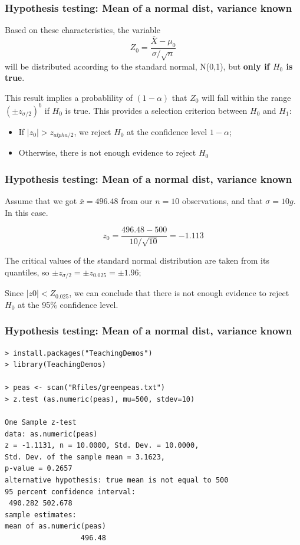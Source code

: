 \documentclass[10pt]{beamer}
\begin{document}
\begin{frame}
  \frametitle{Hypothesis testing: Mean of a normal dist, variance known}
  Based on these characteristics, the variable
  \begin{equation*}
    Z_0 = \frac{\bar{X} - \mu_0}{\sigma/\sqrt{n}}
  \end{equation*}
  will be distributed according to the standard normal, N(0,1), but
  {\bf only if $H_0$ is true}.

  \bigskip

  This result implies a probablility of $(1-\alpha)$ that $Z_0$ will
  fall within the range $(\pm z_{\sigma/2})^b$ if $H_0$ is true. This
  provides a selection criterion between $H_0$ and $H_1$:
  \begin{itemize}
    \item If $|z_0| > z_{alpha/2}$, we reject $H_0$ at the confidence
      level $1-\alpha$;
    \item Otherwise, there is not enough evidence to reject $H_0$
  \end{itemize}  
\end{frame}

\begin{frame}
  \frametitle{Hypothesis testing: Mean of a normal dist, variance known}

  Assume that we got $\bar{x} = 496.48$ from our $n=10$ observations,
  and that $\sigma = 10g$. In this case.

  \medskip

  \begin{equation*}
    z_0 = \frac{496.48 - 500}{10/\sqrt{10}} = -1.113
  \end{equation*}

  \medskip

  The critical values of the standard normal distribution are taken from its 
  quantiles, so $\pm z_{\sigma/2} = \pm z_{0.025} = \pm 1.96$;
  
  Since $|z0| < Z_{0.025}$, we can conclude that there is not enough
  evidence to reject $H_0$ at the 95\% confidence level.
\end{frame}

\begin{frame}
  \frametitle{Hypothesis testing: Mean of a normal dist, variance known}
{\small
\begin{verbatim}
> install.packages("TeachingDemos")
> library(TeachingDemos)

> peas <- scan("Rfiles/greenpeas.txt")
> z.test (as.numeric(peas), mu=500, stdev=10)

One Sample z-test
data: as.numeric(peas)
z = -1.1131, n = 10.0000, Std. Dev. = 10.0000, 
Std. Dev. of the sample mean = 3.1623, 
p-value = 0.2657
alternative hypothesis: true mean is not equal to 500
95 percent confidence interval:
 490.282 502.678
sample estimates:
mean of as.numeric(peas) 
                  496.48
\end{verbatim}}
\end{frame}
\end{document}
